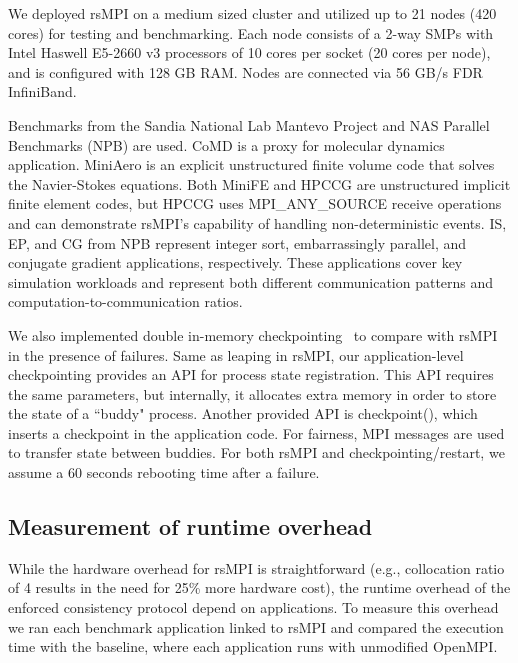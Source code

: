 We deployed rsMPI on a medium sized cluster and utilized up to 21 nodes (420 cores) for testing and benchmarking. Each node consists of a 2-way SMPs with Intel Haswell E5-2660 v3 processors of 10 cores per socket (20 cores per node), and is configured with 128 GB RAM. Nodes are connected via 56 GB/s FDR InfiniBand. %

Benchmarks from the Sandia National Lab Mantevo Project and NAS Parallel Benchmarks (NPB) are used. %
CoMD is a proxy for molecular dynamics application. MiniAero is an explicit unstructured finite volume code that solves the Navier-Stokes equations. Both MiniFE and HPCCG are unstructured implicit finite element codes, but HPCCG uses MPI\_ANY\_SOURCE receive operations and can demonstrate rsMPI's capability of handling non-deterministic events. IS, EP, and CG from NPB represent integer sort, embarrassingly parallel, and conjugate gradient applications, respectively. These applications cover key simulation workloads and represent both different communication patterns and computation-to-communication ratios.

We also implemented double in-memory checkpointing~\cite{zheng2004ftc} to compare with rsMPI in the presence of failures. 
Same as leaping in rsMPI, our application-level checkpointing provides an API for process state registration. This API requires the same parameters, but internally, it allocates extra memory in order to store the state of a ``buddy" process. Another provided API is checkpoint(), which inserts a checkpoint in the application code. For fairness, MPI messages are used to transfer state between buddies.  
For both rsMPI and checkpointing/restart, we assume a 60 seconds rebooting time after a failure. %

\subsection{Measurement of runtime overhead}
\label{sec:runtime_overhead}
While the hardware overhead for rsMPI is straightforward (e.g., collocation ratio of 4 results in the need for 25\% more hardware cost), the runtime overhead of the enforced consistency protocol depend on applications. To measure this overhead we ran each benchmark application linked to rsMPI and compared the execution time with the baseline, where each application runs with unmodified OpenMPI.

